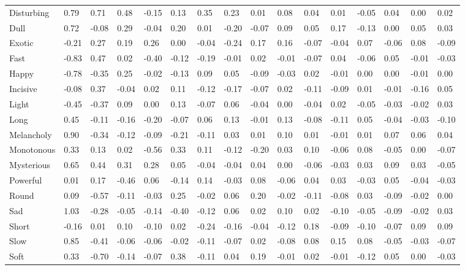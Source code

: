 \documentclass[
]{article}
\newenvironment{lltable}{\begin{landscape}\begin{center}\begin{ThreePartTable}}{\end{ThreePartTable}\end{center}\end{landscape}}
\begin{document}
\begin{lltable}
{\begin{longtable}{llllllllllllllll}
Disturbing & 0.79 & 0.71 & 0.48 & -0.15 & 0.13 & 0.35 & 0.23 & 0.01 & 0.08 & 0.04 & 0.01 & -0.05 & 0.04 & 0.00 & 0.02\\
Dull & 0.72 & -0.08 & 0.29 & -0.04 & 0.20 & 0.01 & -0.20 & -0.07 & 0.09 & 0.05 & 0.17 & -0.13 & 0.00 & 0.05 & 0.03\\
Exotic & -0.21 & 0.27 & 0.19 & 0.26 & 0.00 & -0.04 & -0.24 & 0.17 & 0.16 & -0.07 & -0.04 & 0.07 & -0.06 & 0.08 & -0.09\\
Fast & -0.83 & 0.47 & 0.02 & -0.40 & -0.12 & -0.19 & -0.01 & 0.02 & -0.01 & -0.07 & 0.04 & -0.06 & 0.05 & -0.01 & -0.03\\
Happy & -0.78 & -0.35 & 0.25 & -0.02 & -0.13 & 0.09 & 0.05 & -0.09 & -0.03 & 0.02 & -0.01 & 0.00 & 0.00 & -0.01 & 0.00\\
Incisive & -0.08 & 0.37 & -0.04 & 0.02 & 0.11 & -0.12 & -0.17 & -0.07 & 0.02 & -0.11 & -0.09 & 0.01 & -0.01 & -0.16 & 0.05\\
Light & -0.45 & -0.37 & 0.09 & 0.00 & 0.13 & -0.07 & 0.06 & -0.04 & 0.00 & -0.04 & 0.02 & -0.05 & -0.03 & -0.02 & 0.03\\
Long & 0.45 & -0.11 & -0.16 & -0.20 & -0.07 & 0.06 & 0.13 & -0.01 & 0.13 & -0.08 & -0.11 & 0.05 & -0.04 & -0.03 & -0.10\\
Melancholy & 0.90 & -0.34 & -0.12 & -0.09 & -0.21 & -0.11 & 0.03 & 0.01 & 0.10 & 0.01 & -0.01 & 0.01 & 0.07 & 0.06 & 0.04\\
Monotonous & 0.33 & 0.13 & 0.02 & -0.56 & 0.33 & 0.11 & -0.12 & -0.20 & 0.03 & 0.10 & -0.06 & 0.08 & -0.05 & 0.00 & -0.07\\
Mysterious & 0.65 & 0.44 & 0.31 & 0.28 & 0.05 & -0.04 & -0.04 & 0.04 & 0.00 & -0.06 & -0.03 & 0.03 & 0.09 & 0.03 & -0.05\\
Powerful & 0.01 & 0.17 & -0.46 & 0.06 & -0.14 & 0.14 & -0.03 & 0.08 & -0.06 & 0.04 & 0.03 & -0.03 & 0.05 & -0.04 & -0.03\\
Round & 0.09 & -0.57 & -0.11 & -0.03 & 0.25 & -0.02 & 0.06 & 0.20 & -0.02 & -0.11 & -0.08 & 0.03 & -0.09 & -0.02 & 0.00\\
Sad & 1.03 & -0.28 & -0.05 & -0.14 & -0.40 & -0.12 & 0.06 & 0.02 & 0.10 & 0.02 & -0.10 & -0.05 & -0.09 & -0.02 & 0.03\\
Short & -0.16 & 0.01 & 0.10 & -0.10 & 0.02 & -0.24 & -0.16 & -0.04 & -0.12 & 0.18 & -0.09 & -0.10 & -0.07 & 0.09 & 0.09\\
Slow & 0.85 & -0.41 & -0.06 & -0.06 & -0.02 & -0.11 & -0.07 & 0.02 & -0.08 & 0.08 & 0.15 & 0.08 & -0.05 & -0.03 & -0.07\\
Soft & 0.33 & -0.70 & -0.14 & -0.07 & 0.38 & -0.11 & 0.04 & 0.19 & -0.01 & 0.02 & -0.01 & -0.12 & 0.05 & 0.00 & -0.03\\

\end{longtable}}
\end{lltable}
\end{document}
